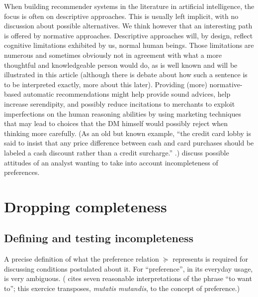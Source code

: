 \documentclass[french, english]{llncs}
\begin{document}
	When building recommender systems in the literature in artificial intelligence, the focus is often on descriptive approaches. This is usually left implicit, with no discussion about possible alternatives. We think however that an interesting path is offered by normative approaches. Descriptive approaches will, by design, reflect cognitive limitations exhibited by us, normal human beings. Those limitations are numerous and sometimes obviously not in agreement with what a more thoughtful and knowledgeable person would do, as is well known and will be illustrated in this article (although there is debate about how such a sentence is to be interpreted exactly, more about this later). Providing (more) normative-based automatic recommendations might help provide sound advices, help increase serendipity, and possibly reduce incitations to merchants to exploit imperfections on the human reasoning abilities by using marketing techniques that may lead to choices that the \ac{DM} himself would possibly reject when thinking more carefully. (As an old but known example, “the credit card lobby is said to insist that any price difference between cash and card purchases should be labeled a cash discount rather than a credit surcharge.” \citep{tversky_rational_1986}.) \citet{fischhoff_knowing_1980} \citep[also]{fischhoff_knowing_1988} discuss possible attitudes of an analyst wanting to take into account incompleteness of preferences.
	

	\section{Dropping completeness}
	
	\subsection{Defining and testing incompleteness}
	\label{sec:empirical}
	A precise definition of what the preference relation $\succeq$ represents is required for discussing conditions postulated about it. For “preference”, in its everyday usage, is very ambiguous. (\citet{frankfurt_freedom_1971} cites seven reasonable interpretations of the phrase “to want to”; this exercice transposes, \emph{mutatis mutandis}, to the concept of preference.)
	
\end{document}
